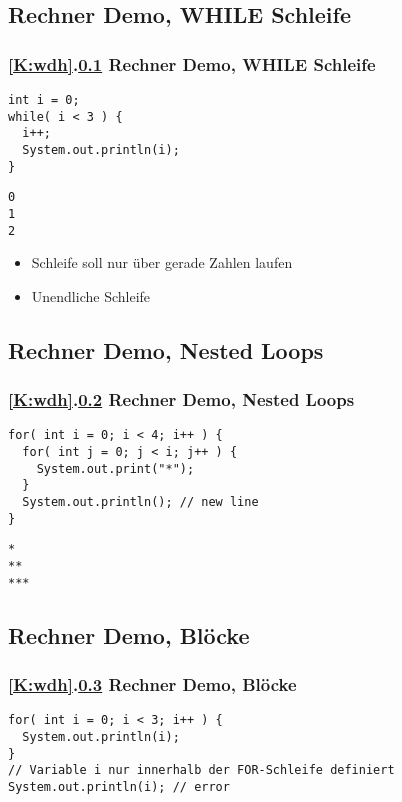 \def\stitle{Rechner Demo, WHILE Schleife}
\subsection{\stitle}\label{S:RechnerDemo2}
\begin{frame}[fragile]%
  \frametitle{\ref{K:wdh}.\ref{S:RechnerDemo2} \stitle}%


\begin{lstlisting}[title={Beispiel Programm},style=java, frame=single]
int i = 0;
while( i < 3 ) {
  i++;
  System.out.println(i);
}
\end{lstlisting}

\begin{lstlisting}[title=output,style=java, frame=single]
0
1
2
\end{lstlisting}
\hfill

\begin{itemize}
\item Schleife soll nur über gerade Zahlen laufen
\item Unendliche Schleife
\end{itemize}
\end{frame}


\def\stitle{Rechner Demo, Nested Loops}
\subsection{\stitle}\label{S:RechnerDemo3}
\begin{frame}[fragile]%
  \frametitle{\ref{K:wdh}.\ref{S:RechnerDemo3} \stitle}%


\begin{lstlisting}[title={Beispiel Programm},style=java, frame=single]
for( int i = 0; i < 4; i++ ) {
  for( int j = 0; j < i; j++ ) {
    System.out.print("*");
  }
  System.out.println(); // new line
}
\end{lstlisting}
\bigskip
\pause

\begin{lstlisting}[title=output,style=java, frame=single]
*
**
***
\end{lstlisting}
\end{frame}

\def\stitle{Rechner Demo, Blöcke}
\subsection{\stitle}\label{S:RechnerDemo4}
\begin{frame}[fragile]%
  \frametitle{\ref{K:wdh}.\ref{S:RechnerDemo4} \stitle}%

\begin{lstlisting}[style=java, frame=single]
for( int i = 0; i < 3; i++ ) {
  System.out.println(i);
}
// Variable i nur innerhalb der FOR-Schleife definiert
System.out.println(i); // error
\end{lstlisting}

\end{frame}
